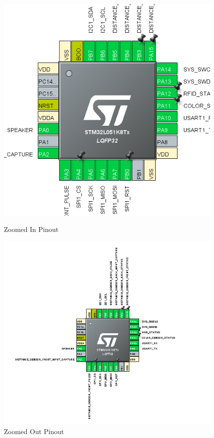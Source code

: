 \documentclass{article}
\begin{document}
\begin{figure}[H]
    \centering
    \begin{minipage}[b]{0.45\textwidth} %
        \centering
        \includegraphics[width=8\textwidth, height=0.4\textheight, keepaspectratio]{Figures/stm32_pinout_in.png}
        \caption{Zoomed In Pinout}
        \label{fig:stm32_pinout_zoomed_in}
    \end{minipage} \hfill
    \begin{minipage}[b]{0.48\textwidth} %
        \centering
        \includegraphics[width=\textwidth, height=0.4\textheight, keepaspectratio]{Figures/stm32_pinout_out.png}
        \caption{Zoomed Out Pinout}
        \label{fig:stm32_pinout_zoomed_out}
    \end{minipage}
\end{figure}
\end{document}
